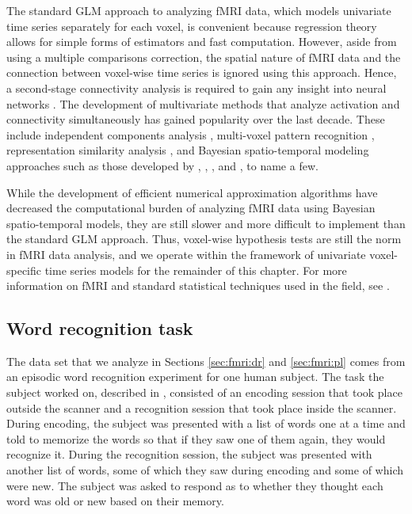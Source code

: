 The standard GLM approach to analyzing fMRI data, which models univariate time series separately for each voxel, is convenient because regression theory allows for simple forms of estimators and fast computation. However, aside from using a multiple comparisons correction, the spatial nature of fMRI data and the connection between voxel-wise time series is ignored using this approach. Hence, a second-stage connectivity analysis is required to gain any insight into neural networks \cite[Chapters 8 and 9][]{ashby:fmri:2011}. The development of multivariate methods that analyze activation and connectivity simultaneously has gained popularity over the last decade. These include independent components analysis \citep{beck:smith:ica:2004}, multi-voxel pattern recognition \citet{norman:mvpa:2006}, representation similarity analysis \citep{nili:rs:2014}, and Bayesian spatio-temporal modeling approaches such as those developed by \citet{wool:jenk:bayesSp:2004}, \citet{bowman:2008:SpMCMC}, \citet{quiros:diez:2010:BayesSpTemp}, and \citet{zhang:guin:2014:npBayesWave}, to name a few.

While the development of efficient numerical approximation algorithms have decreased the computational burden of analyzing fMRI data using Bayesian spatio-temporal models, they are still slower and more difficult to implement than the standard GLM approach. Thus, voxel-wise hypothesis tests are still the norm in fMRI data analysis, and we operate within the framework of univariate voxel-specific time series models for the remainder of this chapter. For more information on fMRI and standard statistical techniques used in the field, see \citet{ashby:fmri:2011, penny:spm:2011}.

\subsection{Word recognition task \label{sec:fmri:data}}

The data set that we analyze in Sections \ref{sec:fmri:dr} and \ref{sec:fmri:pl} comes from an episodic word recognition experiment for one human subject. The task the subject worked on, described in \citet{bennett:miller:2013}, consisted of an encoding session that took place outside the scanner and a recognition session that took place inside the scanner. During encoding, the subject was presented with a list of words one at a time and told to memorize the words so that if they saw one of them again, they would recognize it. During the recognition session, the subject was presented with another list of words, some of which they saw during encoding and some of which were new. The subject was asked to respond as to whether they thought each word was old or new based on their memory.

